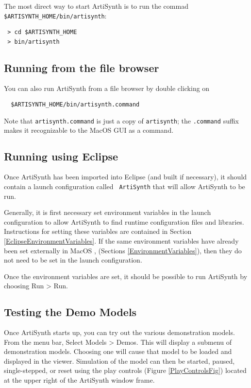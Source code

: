 \documentclass{article}
\def\SEP{/}
\def\SYSTEM{MacOS }
\begin{document}
The most direct way to start ArtiSynth is to run the commad
{\tt \$ARTISYNTH\_HOME\SEP bin\SEP artisynth}:

\begin{verbatim}
 > cd $ARTISYNTH_HOME
 > bin/artisynth
\end{verbatim}

\subsection{Running from the file browser}

You can also run ArtiSynth from a file browser by double clicking on
\begin{verbatim}
  $ARTISYNTH_HOME/bin/artisynth.command
\end{verbatim}
Note that {\tt artisynth.command} is just a copy of {\tt artisynth};
the {\tt .command} suffix makes it recognizable to the MacOS GUI as a
command.

\subsection{Running using Eclipse}

Once ArtiSynth has been imported into Eclipse (and built if
necessary), it should contain a launch configuration called {\tt
ArtiSynth} that will allow ArtiSynth to be run.

Generally, it is first necessary set environment variables in the
launch configuration to allow ArtiSynth to find runtime configuration
files and libraries. Instructions for setting these variables are
contained in Section \ref{EclipseEnvironmentVariables}.  If the same
environment variables have already been set externally in \SYSTEM,
(Sections \ref{EnvironmentVariables}), then they do not need to be set
in the launch configuration.

Once the environment variables are set, it should be possible to run
ArtiSynth by choosing {\sf Run > Run}.

\subsection{Testing the Demo Models}

Once ArtiSynth starts up, you can try out the various demonstration
models. From the menu bar, Select {\sf Models > Demos}.  This
will display a submenu of demonstration models. Choosing one will
cause that model to be loaded and displayed in the viewer.  Simulation
of the model can then be started, paused, single-stepped, or reset
using the play controls (Figure \ref{PlayControlsFig})
located at the upper right of the ArtiSynth window frame.
\end{document}
